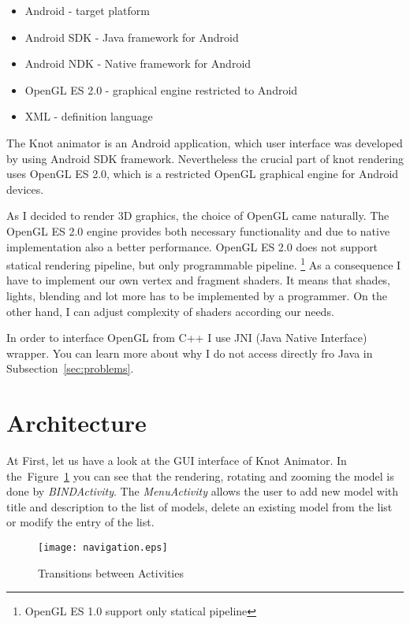 \begin{itemize}
  \item Android - target platform 
  \item Android SDK - Java framework for Android
  \item Android NDK - Native framework for Android
  \item OpenGL ES 2.0 - graphical engine restricted to Android
  \item XML - definition language 
\end{itemize}

The Knot animator is an Android application, 
which user interface was developed by using Android SDK framework.
Nevertheless the crucial part of knot rendering uses OpenGL ES 2.0,
which is a restricted OpenGL graphical engine for Android devices.

As I decided to render 3D graphics, the choice of OpenGL came naturally.
The OpenGL ES 2.0 engine provides both necessary functionality and due to
native implementation also a better performance.
OpenGL ES 2.0 does not support statical rendering pipeline, 
but only programmable pipeline. \footnote{OpenGL ES 1.0 support only statical pipeline}
As a consequence I have to implement our own vertex and fragment shaders.
It means that shades, lights, blending and lot more has to be implemented by a programmer.
On the other hand, I can adjust complexity of shaders according our needs.

In order to interface OpenGL from C++ I use JNI (Java Native Interface) wrapper.
You can learn more about why I do not access directly fro Java in Subsection~\ref{sec:problems}.


\section*{Architecture} %
\label{sec:Architecture}


At First, let us have a look at the GUI interface of Knot Animator.
In the~Figure~\ref{pic:navigation} you can see that the rendering, rotating and zooming the model
is done by {\it BINDActivity}. The {\it MenuActivity} allows the user to add new model with title
and description to the list of models, delete an existing model from the list or modify the entry of the list.

\begin{figure}
\begin{center}
\texttt{[image: navigation.eps]}
\label{pic:navigation}
\caption{Transitions between Activities}
\end{center}
\end{figure}


